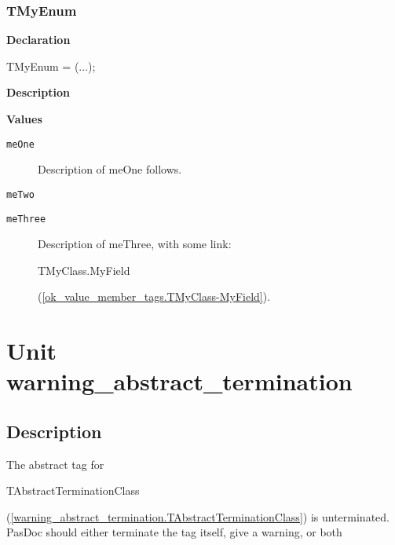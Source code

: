 \documentclass{report}
\newif\ifpdf
\begin{document}
\subsection*{TMyEnum}
\fi
\label{ok_value_member_tags-TMyEnum}
\begin{list}{}{
\setlength{\itemindent}{0cm}
\setlength{\listparindent}{0cm}
\setlength{\leftmargin}{\evensidemargin}
\addtolength{\leftmargin}{\tmplength}
\settowidth{\labelsep}{X}
\addtolength{\leftmargin}{\labelsep}
\setlength{\labelwidth}{\tmplength}
}
\item[\textbf{Declaration}\hfill]
\ifpdf
\begin{flushleft}
\fi
\begin{ttfamily}
TMyEnum = (...);\end{ttfamily}

\ifpdf
\end{flushleft}
\fi

\par
\item[\textbf{Description}]
 \item[\textbf{Values}]
\begin{description}
\item[\texttt{meOne}] \label{ok_value_member_tags-meOne}
\index{}
Description of meOne follows.
\item[\texttt{meTwo}] \label{ok_value_member_tags-meTwo}
\index{}
 
\item[\texttt{meThree}] \label{ok_value_member_tags-meThree}
\index{}
Description of meThree, with some link: \begin{ttfamily}TMyClass.MyField\end{ttfamily}(\ref{ok_value_member_tags.TMyClass-MyField}).
\end{description}


\end{list}
\chapter{Unit warning{\_}abstract{\_}termination}
\label{warning_abstract_termination}
\section{Description}
The abstract tag for \begin{ttfamily}TAbstractTerminationClass\end{ttfamily}(\ref{warning_abstract_termination.TAbstractTerminationClass}) is unterminated. PasDoc should either terminate the tag itself, give a warning, or both\hfill\vspace*{1ex}
\end{document}
